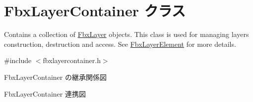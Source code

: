 \hypertarget{class_fbx_layer_container}{}\section{Fbx\+Layer\+Container クラス}
\label{class_fbx_layer_container}


Contains a collection of \hyperlink{class_fbx_layer}{Fbx\+Layer} objects. This class is used for managing layers construction, destruction and access. See \hyperlink{class_fbx_layer_element}{Fbx\+Layer\+Element} for more details.  




{\ttfamily \#include $<$fbxlayercontainer.\+h$>$}



Fbx\+Layer\+Container の継承関係図


Fbx\+Layer\+Container 連携図
